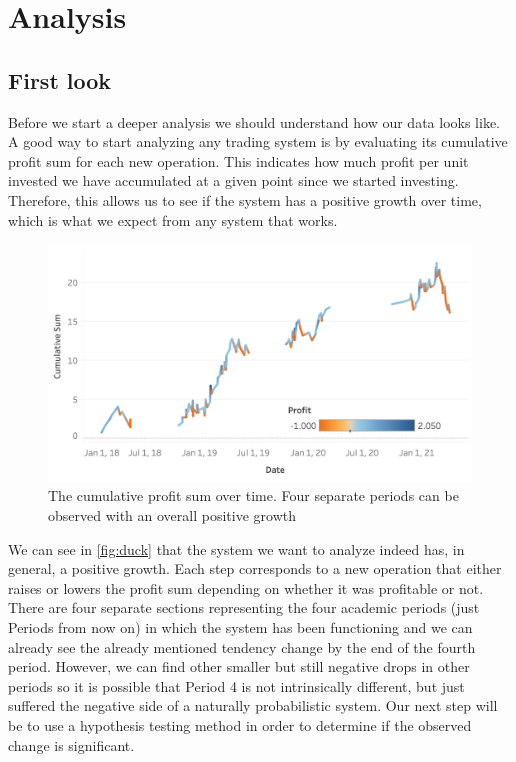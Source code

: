 \documentclass[sigconf, nonacm]{acmart}
\begin{document}
\section{Analysis}
\subsection{First look}

Before we start a deeper analysis we should understand how our data looks like. A good way to start analyzing any trading system is by evaluating its cumulative profit sum for each new operation. This indicates how much profit per unit invested we have accumulated at a given point since we started investing. Therefore, this allows us to see if the system has a positive growth over time, which is what we expect from any system that works.\\

\begin{figure}
  \centering
  \includegraphics[width=\linewidth]{figures/pic1}
  \caption{The cumulative profit sum over time. Four separate periods can be observed with an overall positive growth}
  \label{fig:duck}
\end{figure}

We can see in \autoref{fig:duck} that the system we want to analyze indeed has, in general, a positive growth. Each step corresponds to a new operation that either raises or lowers the profit sum depending on whether it was profitable or not.\\

There are four separate sections representing the four academic periods (just Periods from now on) in which the system has been functioning and we can already see the already mentioned tendency change by the end of the fourth period. However, we can find other smaller but still negative drops in other periods so it is possible that Period 4 is not intrinsically different, but just suffered the negative side of a naturally probabilistic system. Our next step will be to use a hypothesis testing method in order to determine if the observed change is significant.
\end{document}
